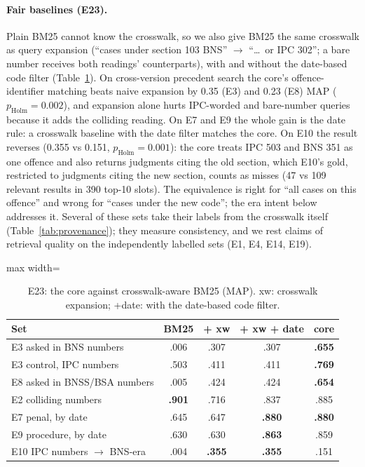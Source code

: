 \documentclass[sigconf,nonacm]{acmart}
\newcommand{\ph}{p_{\text{Holm}}}
\begin{document}
\paragraph{Fair baselines (E23).} Plain BM25 cannot know the crosswalk, so we also give BM25 the
same crosswalk as query expansion (``cases under section 103 BNS'' $\to$ ``\ldots\ or IPC 302'';
a bare number receives both readings' counterparts), with and without the date-based code filter
(Table~\ref{tab:fair}). On cross-version precedent search the core's offence-identifier matching
beats naive expansion by 0.35 (E3) and 0.23 (E8) MAP ($\ph=0.002$), and expansion alone hurts
IPC-worded and bare-number queries because it adds the colliding reading. On E7 and E9 the whole
gain is the date rule: a crosswalk baseline with the date filter matches the core. On E10 the
result reverses (0.355 vs 0.151, $\ph=0.001$): the core treats IPC 503 and BNS 351 as one offence
and also returns judgments citing the old section, which E10's gold, restricted to judgments
citing the new section, counts as misses (47 vs 109 relevant results in 390 top-10 slots). The
equivalence is right for ``all cases on this offence'' and wrong for ``cases under the new code'';
the era intent below addresses it. Several of these sets take their labels from the crosswalk itself
(Table~\ref{tab:provenance}); they measure consistency, and we rest claims of retrieval quality on
the independently labelled sets (E1, E4, E14, E19).

\begin{table}[t]
\centering\small
\caption{E23: the core against crosswalk-aware BM25 (MAP). xw: crosswalk expansion; +date: with
the date-based code filter.}
\label{tab:fair}
\begin{adjustbox}{max width=\linewidth}
\begin{tabular}{lcccc}
\toprule
Set & BM25 & + xw & + xw + date & core \\
\midrule
E3 asked in BNS numbers & .006 & .307 & .307 & \textbf{.655} \\
E3 control, IPC numbers & .503 & .411 & .411 & \textbf{.769} \\
E8 asked in BNSS/BSA numbers & .005 & .424 & .424 & \textbf{.654} \\
E2 colliding numbers & \textbf{.901} & .716 & .837 & .885 \\
E7 penal, by date & .645 & .647 & \textbf{.880} & \textbf{.880} \\
E9 procedure, by date & .630 & .630 & \textbf{.863} & .859 \\
E10 IPC numbers $\to$ BNS-era & .004 & \textbf{.355} & \textbf{.355} & .151 \\
\bottomrule
\end{tabular}
\end{adjustbox}
\end{table}
\end{document}
